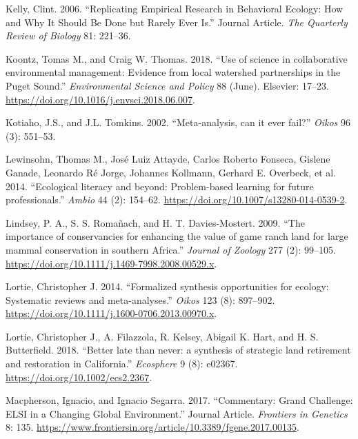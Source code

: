 \documentclass[fleqn,10pt]{wlpeerj} %
\begin{document}
\leavevmode\hypertarget{ref-Kelly2006}{}%
Kelly, Clint. 2006. ``Replicating Empirical Research in Behavioral
Ecology: How and Why It Should Be Done but Rarely Ever Is.'' Journal
Article. \emph{The Quarterly Review of Biology} 81: 221--36.

\leavevmode\hypertarget{ref-Koontz2018}{}%
Koontz, Tomas M., and Craig W. Thomas. 2018. ``Use of science in
collaborative environmental management: Evidence from local watershed
partnerships in the Puget Sound.'' \emph{Environmental Science and
Policy} 88 (June). Elsevier: 17--23.
\url{https://doi.org/10.1016/j.envsci.2018.06.007}.

\leavevmode\hypertarget{ref-Kotiaho2002}{}%
Kotiaho, J.S., and J.L. Tomkins. 2002. ``Meta-analysis, can it ever
fail?'' \emph{Oikos} 96 (3): 551--53.

\leavevmode\hypertarget{ref-Lewinsohn2014}{}%
Lewinsohn, Thomas M., José Luiz Attayde, Carlos Roberto Fonseca, Gislene
Ganade, Leonardo Ré Jorge, Johannes Kollmann, Gerhard E. Overbeck, et
al. 2014. ``Ecological literacy and beyond: Problem-based learning for
future professionals.'' \emph{Ambio} 44 (2): 154--62.
\url{https://doi.org/10.1007/s13280-014-0539-2}.

\leavevmode\hypertarget{ref-Lindsey2009}{}%
Lindsey, P. A., S. S. Romañach, and H. T. Davies-Mostert. 2009. ``The
importance of conservancies for enhancing the value of game ranch land
for large mammal conservation in southern Africa.'' \emph{Journal of
Zoology} 277 (2): 99--105.
\url{https://doi.org/10.1111/j.1469-7998.2008.00529.x}.

\leavevmode\hypertarget{ref-Lortie2014}{}%
Lortie, Christopher J. 2014. ``Formalized synthesis opportunities for
ecology: Systematic reviews and meta-analyses.'' \emph{Oikos} 123 (8):
897--902. \url{https://doi.org/10.1111/j.1600-0706.2013.00970.x}.

\leavevmode\hypertarget{ref-Lortie2018}{}%
Lortie, Christopher J., A. Filazzola, R. Kelsey, Abigail K. Hart, and H.
S. Butterfield. 2018. ``Better late than never: a synthesis of strategic
land retirement and restoration in California.'' \emph{Ecosphere} 9 (8):
e02367. \url{https://doi.org/10.1002/ecs2.2367}.

\leavevmode\hypertarget{ref-Macpherson2017}{}%
Macpherson, Ignacio, and Ignacio Segarra. 2017. ``Commentary: Grand
Challenge: ELSI in a Changing Global Environment.'' Journal Article.
\emph{Frontiers in Genetics} 8: 135.
\url{https://www.frontiersin.org/article/10.3389/fgene.2017.00135}.
\end{document}
